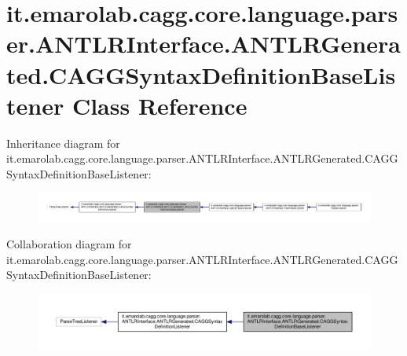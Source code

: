 \hypertarget{classit_1_1emarolab_1_1cagg_1_1core_1_1language_1_1parser_1_1ANTLRInterface_1_1ANTLRGenerated_1_1a45b55289931e185944c10a916c8cdd}{\section{it.\-emarolab.\-cagg.\-core.\-language.\-parser.\-A\-N\-T\-L\-R\-Interface.\-A\-N\-T\-L\-R\-Generated.\-C\-A\-G\-G\-Syntax\-Definition\-Base\-Listener Class Reference}
\label{classit_1_1emarolab_1_1cagg_1_1core_1_1language_1_1parser_1_1ANTLRInterface_1_1ANTLRGenerated_1_1a45b55289931e185944c10a916c8cdd}
}


Inheritance diagram for it.\-emarolab.\-cagg.\-core.\-language.\-parser.\-A\-N\-T\-L\-R\-Interface.\-A\-N\-T\-L\-R\-Generated.\-C\-A\-G\-G\-Syntax\-Definition\-Base\-Listener\-:\nopagebreak
\begin{figure}[H]
\begin{center}
\leavevmode
\includegraphics[width=350pt]{classit_1_1emarolab_1_1cagg_1_1core_1_1language_1_1parser_1_1ANTLRInterface_1_1ANTLRGenerated_1_5bcb52eeaaed87590d50773189cdd2f7}
\end{center}
\end{figure}


Collaboration diagram for it.\-emarolab.\-cagg.\-core.\-language.\-parser.\-A\-N\-T\-L\-R\-Interface.\-A\-N\-T\-L\-R\-Generated.\-C\-A\-G\-G\-Syntax\-Definition\-Base\-Listener\-:\nopagebreak
\begin{figure}[H]
\begin{center}
\leavevmode
\includegraphics[width=350pt]{classit_1_1emarolab_1_1cagg_1_1core_1_1language_1_1parser_1_1ANTLRInterface_1_1ANTLRGenerated_1_f8cf75257f9aa154d5e50b5ae1863ab2}
\end{center}
\end{figure}
